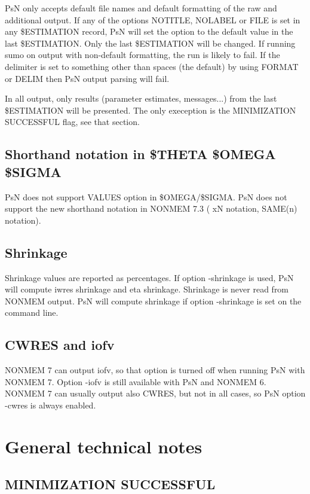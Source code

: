 	PsN only accepts default file names and default formatting of the raw and additional output. If any of the options NOTITLE, NOLABEL or FILE is set in any \$ESTIMATION record, PsN will set the option to the default value in the last \$ESTIMATION. Only the last \$ESTIMATION will be changed. If running sumo on output with non-default formatting, the run is likely to fail. If the delimiter is set to something other than spaces (the default) by using FORMAT or DELIM then PsN output parsing will fail.
	
	In all output, only results (parameter estimates, messages...) from the last \$ESTIMATION will be presented. The only exeception is the MINIMIZATION SUCCESSFUL flag, see that section.
	
	\subsection{Shorthand notation in \$THETA \$OMEGA \$SIGMA}
	PsN does not support VALUES option in \$OMEGA/\$SIGMA. 
	PsN does not support the new shorthand notation in NONMEM 7.3 ( xN notation, SAME(n) notation).
	
	\subsection{Shrinkage}
	
	Shrinkage values are reported as percentages. If option -shrinkage is used, PsN will compute iwres shrinkage and eta shrinkage. 
	Shrinkage is never read from NONMEM output. PsN will compute shrinkage if option -shrinkage is set on the command line.
	
	\subsection{CWRES and iofv}
	
	NONMEM 7 can output iofv, so that option is turned off when running PsN with NONMEM 7. Option -iofv is still available with PsN and NONMEM 6.
	NONMEM 7 can usually output also CWRES, but not in all cases,
	so PsN option -cwres is always enabled.
	
	
	
	
	\section{General technical notes}
	
	\subsection{MINIMIZATION SUCCESSFUL}
	
